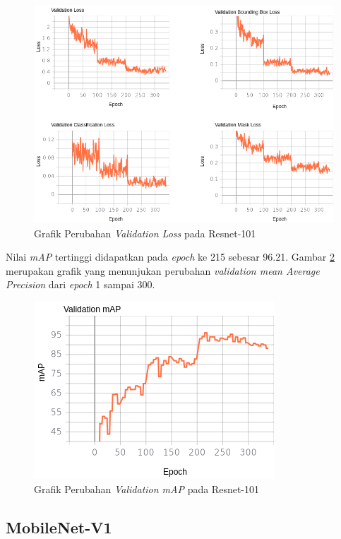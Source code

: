 \begin{figure}[h]
	\centering
	\includegraphics[scale=0.36]{gambar/resnet101-val.png}
	\caption{Grafik Perubahan \textit{Validation Loss} pada Resnet-101}
	\label{fig:resnet101-val}
\end{figure}

Nilai \textit{mAP} tertinggi didapatkan pada \textit{epoch} ke 215 sebesar 96.21. Gambar \ref{fig:resnet101-map} merupakan grafik yang menunjukan perubahan \textit{validation mean Average Precision} dari \textit{epoch} 1 sampai 300.

\begin{figure}[h]
	\centering
	\includegraphics[scale=0.4]{gambar/resnet101-map.png}
	\caption{Grafik Perubahan \textit{Validation mAP} pada Resnet-101}
	\label{fig:resnet101-map}
\end{figure} 

\newpage

\subsection{MobileNet-V1}
\label{subsec:mobilenetv1}

